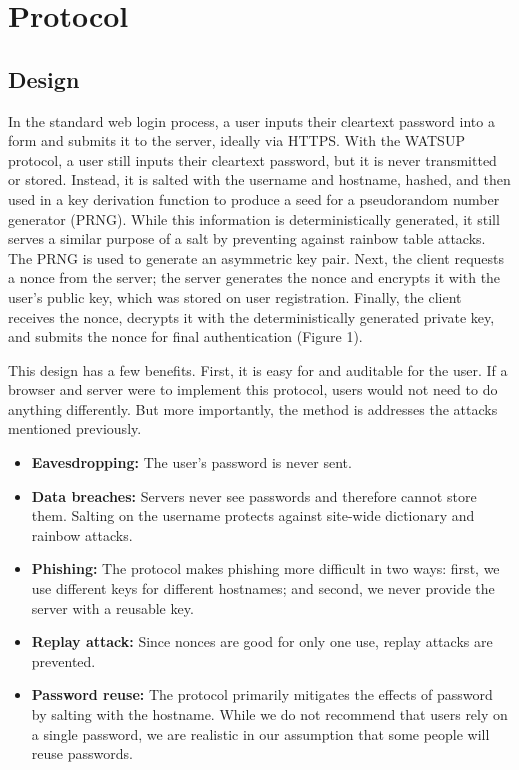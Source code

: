 \section{Protocol}
\label{sec:protocol}

\subsection{Design}

In the standard web login process, a user inputs their cleartext password into a form and submits it to the server, ideally via HTTPS. With the WATSUP protocol, a user still inputs their cleartext password, but it is never transmitted or stored. Instead, it is salted with the username and hostname, hashed, and then used in a key derivation function to produce a seed for a pseudorandom number generator (PRNG). While this information is deterministically generated, it still serves a similar purpose of a salt by preventing against rainbow table attacks. The PRNG is used to generate an asymmetric key pair. Next, the client requests a nonce from the server; the server generates the nonce and encrypts it with the user's public key, which was stored on user registration. Finally, the client receives the nonce, decrypts it with the deterministically generated private key, and submits the nonce for final authentication (Figure 1).

This design has a few benefits. First, it is easy for and auditable for the user. If a browser and server were to implement this protocol, users would not need to do anything differently. But more importantly, the method is addresses the attacks mentioned previously.

\begin{itemize}

    \item \textbf{Eavesdropping:} The user's password is never sent.

    \item \textbf{Data breaches:} Servers never see passwords and therefore cannot store them. Salting on the username protects against site-wide dictionary and rainbow attacks.

    \item \textbf{Phishing:} The protocol makes phishing more difficult in two ways: first, we use different keys for different hostnames; and second, we never provide the server with a reusable key.

    \item \textbf{Replay attack:} Since nonces are good for only one use, replay attacks are prevented.

    \item \textbf{Password reuse:} The protocol primarily mitigates the effects of password by salting with the hostname. While we do not recommend that users rely on a single password, we are realistic in our assumption that some people will reuse passwords.

\end{itemize}

